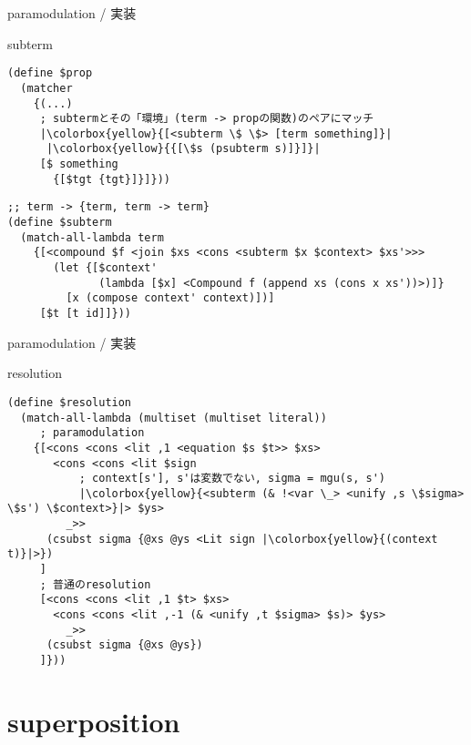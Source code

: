 \documentclass[dvipdfmx,11pt,notheorems]{beamer}
\theoremstyle{definition}
\begin{document}
\begin{frame}[fragile]{paramodulation / 実装}
  \begin{block}{subterm}
    \begin{verbatim}
(define $prop
  (matcher
    {(...)
     ; subtermとその「環境」(term -> propの関数)のペアにマッチ
     |\colorbox{yellow}{[<subterm \$ \$> [term something]}|
      |\colorbox{yellow}{{[\$s (psubterm s)]}]}|
     [$ something
       {[$tgt {tgt}]}]}))
    \end{verbatim}
  \end{block}

  \begin{block}{}
    \begin{verbatim}
;; term -> {term, term -> term}
(define $subterm
  (match-all-lambda term
    {[<compound $f <join $xs <cons <subterm $x $context> $xs'>>>
       (let {[$context'
              (lambda [$x] <Compound f (append xs (cons x xs'))>)]}
         [x (compose context' context)])]
     [$t [t id]]}))
    \end{verbatim}
  \end{block}
\end{frame}

\begin{frame}[fragile]{paramodulation / 実装}
  \begin{block}{resolution}
    \begin{verbatim}
(define $resolution
  (match-all-lambda (multiset (multiset literal))
     ; paramodulation
    {[<cons <cons <lit ,1 <equation $s $t>> $xs>
       <cons <cons <lit $sign
           ; context[s'], s'は変数でない, sigma = mgu(s, s')
           |\colorbox{yellow}{<subterm (& !<var \_> <unify ,s \$sigma> \$s') \$context>}|> $ys>
         _>>
      (csubst sigma {@xs @ys <Lit sign |\colorbox{yellow}{(context t)}|>})
     ]
     ; 普通のresolution
     [<cons <cons <lit ,1 $t> $xs>
       <cons <cons <lit ,-1 (& <unify ,t $sigma> $s)> $ys>
         _>>
      (csubst sigma {@xs @ys})
     ]}))
    \end{verbatim}
  \end{block}
\end{frame}

\section{superposition}
\end{document}
